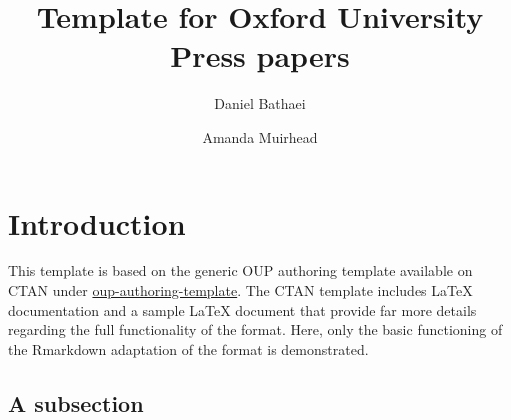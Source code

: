 \documentclass[webpdf,large,modern,namedate]{oup-authoring-template}
\theoremstyle{thmstyleone}
\theoremstyle{thmstyletwo}
\theoremstyle{thmstylethree}
\begin{document}




\title[]{Template for Oxford University Press papers}




\author[%
%
%
%
%
]{Daniel Bathaei}







\author[%
%
%
%
%
]{Amanda Muirhead}










\abstract{
}

\keywords{}


\maketitle


\hypertarget{introduction}{%
\section{Introduction}\label{introduction}}

This template is based on the generic OUP authoring template available
on CTAN under
\href{https://www.ctan.org/pkg/oup-authoring-template}{oup-authoring-template}.
The CTAN template includes LaTeX documentation and a sample LaTeX
document that provide far more details regarding the full functionality
of the format. Here, only the basic functioning of the Rmarkdown
adaptation of the format is demonstrated.

\hypertarget{a-subsection}{%
\subsection{A subsection}\label{a-subsection}}
\end{document}
